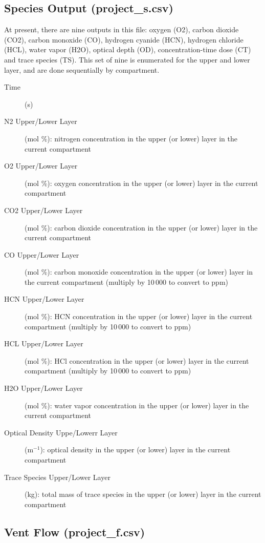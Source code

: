 \subsection{Species Output (project\_s.csv)}

At present, there are nine outputs in this file: oxygen (O2), carbon dioxide (CO2), carbon monoxide (CO),  hydrogen cyanide (HCN), hydrogen chloride (HCL), water vapor (H2O), optical depth (OD), concentration-time dose (CT) and trace species (TS). This set of nine is enumerated for the upper and lower layer, and are done sequentially by compartment.
\begin{description}
\item[Time] (s)
\item[N2 Upper/Lower Layer] (mol \%): nitrogen concentration in the upper (or lower) layer in the current compartment
\item[O2 Upper/Lower Layer] (mol \%): oxygen concentration in the upper (or lower) layer in the current compartment
\item[CO2 Upper/Lower Layer] (mol \%):  carbon dioxide concentration in the upper (or lower) layer in the current compartment
\item[CO Upper/Lower Layer] (mol \%):  carbon monoxide concentration in the upper (or lower) layer in the current compartment (multiply by 10\,000 to convert to ppm)
\item[HCN Upper/Lower Layer] (mol \%):  HCN concentration in the upper (or lower) layer in the current compartment (multiply by 10\,000 to convert to ppm)
\item[HCL Upper/Lower Layer] (mol \%):  HCl concentration in the upper (or lower) layer in the current compartment (multiply by 10\,000 to convert to ppm)
\item[H2O Upper/Lower Layer] (mol \%):  water vapor concentration in the upper (or lower) layer in the current compartment
\item[Optical Density Uppe/Lowerr Layer] (m$^{-1}$):  optical density in the upper (or lower) layer in the current compartment
\item[Trace Species Upper/Lower Layer] (kg):  total mass of trace species in the upper (or lower) layer in the current compartment
\end{description}

\subsection{Vent Flow (project\_f.csv)}

